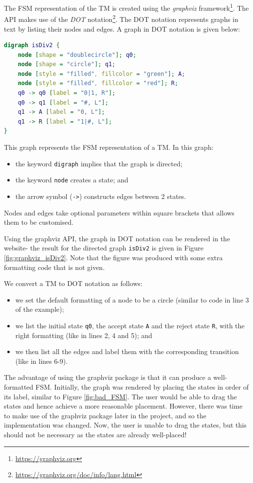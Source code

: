 The FSM representation of the TM is created using the \emph{graphviz} framework\footnote{\url{https://graphviz.org}}. The API makes use of the \emph{DOT} notation\footnote{\url{https://graphviz.org/doc/info/lang.html}}. The DOT notation represents graphs in text by listing their nodes and edges. A graph in DOT notation is given below:
\begin{lstlisting}[language=DOT]
digraph isDiv2 {
    node [shape = "doublecircle"]; q0;
    node [shape = "circle"]; q1;
    node [style = "filled", fillcolor = "green"]; A;
    node [style = "filled", fillcolor = "red"]; R;
    q0 -> q0 [label = "0|1, R"];
    q0 -> q1 [label = "#, L"];
    q1 -> A [label = "0, L"];
    q1 -> R [label = "1|#, L"];
}
\end{lstlisting}
This graph represents the FSM representation of a TM. In this graph:
\begin{itemize}
    \item the keyword \texttt{digraph} implies that the graph is directed;
    \item the keyword \texttt{node} creates a state; and
    \item the arrow symbol (\texttt{->}) constructs edges between 2 states.
\end{itemize}
Nodes and edges take optional parameters within square brackets that allows them to be customised.

Using the graphviz API, the graph in DOT notation can be rendered in the website- the result for the directed graph \texttt{isDiv2} is given in Figure \ref{fig:graphviz_isDiv2}. Note that the figure was produced with some extra formatting code that is not given.

We convert a TM to DOT notation as follows:
\begin{itemize}
    \item we set the default formatting of a node to be a circle (similar to code in line 3 of the example);
    \item we list the initial state \texttt{q0}, the accept state \texttt{A} and the reject state \texttt{R}, with the right formatting (like in lines 2, 4 and 5); and 
    \item we then list all the edges and label them with the corresponding transition (like in lines 6-9).
\end{itemize}

The advantage of using the graphviz package is that it can produce a well-formatted FSM. Initially, the graph was rendered by placing the states in order of its label, similar to Figure \ref{fig:bad_FSM}. The user would be able to drag the states and hence achieve a more reasonable placement. However, there was time to make use of the graphviz package later in the project, and so the implementation was changed. Now, the user is unable to drag the states, but this should not be necessary as the states are already well-placed!

